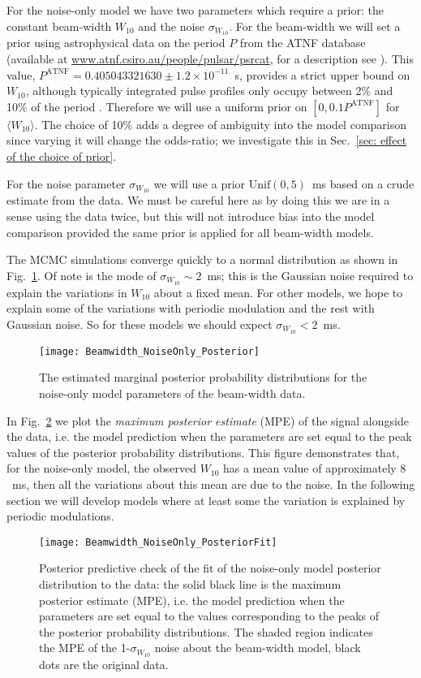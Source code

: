 \documentclass[../full_thesis/full_thesis.tex]{subfiles}
\newcommand{\PATNF}{P^{\mathrm{ATNF}}}
\newcommand{\Wave}{\langle W_{10} \rangle}
\begin{document}
For the noise-only model we have two parameters which require a prior: the
constant beam-width $W_{10}$ and the noise $\sigma_{W_{10}}$. For the
beam-width we will set a prior using astrophysical data on the period $P$
from the ATNF database
(available at \url{www.atnf.csiro.au/people/pulsar/psrcat}, for a description
see \cite{ATNF}). This value, $\PATNF=0.405043321630\pm 1.2\times10^{-11}$~s,
provides a strict upper bound on $W_{10}$, although typically integrated
pulse profiles only occupy between 2\% and 10\% of the period \citep{Lyne1988}.
Therefore we will use a uniform prior on $[0, 0.1 \PATNF]$ for $\Wave$.
The choice of 10\% adds a degree of ambiguity into the model comparison since
varying it will change the odds-ratio; we investigate this in
Sec.~\ref{sec: effect of the choice of prior}.

For the noise parameter
$\sigma_{W_{10}}$ we will use a prior $\textrm{Unif}(0, 5)$~ms
based on a crude estimate from the data. We must be careful here as by doing
this we are in a sense using the data twice, but this will not introduce bias
into the model comparison provided the same prior is applied for all beam-width
models.

The MCMC simulations converge quickly to a normal distribution as shown in
Fig.~\ref{fig: noise-only beam-width posterior}. Of note is the mode of
$\sigma_{W_{10}}\sim 2$~ms; this is the Gaussian noise required to explain the
variations in $W_{10}$ about a fixed mean. For other models, we hope to explain
some of the variations with periodic modulation and the rest with Gaussian
noise. So for these models we should expect $\sigma_{W_{10}} < 2$~ms.

\begin{figure}
\centering
\texttt{[image: Beamwidth\_NoiseOnly\_Posterior]}
\caption{The estimated marginal posterior probability distributions for the
noise-only model parameters of the beam-width data.}
\label{fig: noise-only beam-width posterior}
\end{figure}

In Fig.~\ref{fig: noise-only beam-width posterior fit} we plot the
\emph{maximum posterior estimate} (MPE) of the signal alongside the data, i.e.
the model prediction when the parameters are set equal to the peak values of
the posterior probability distributions.  This figure demonstrates that, for
the noise-only model, the observed $W_{10}$ has a mean value of approximately
$8$~ms, then all the variations about this mean are due to the noise. In the
following section we will develop models where at least some the variation is
explained by periodic modulations.
\begin{figure}
\centering
\texttt{[image: Beamwidth\_NoiseOnly\_PosteriorFit]}
\caption{Posterior predictive check of the fit of the noise-only model
posterior distribution to the data: the solid black line is the maximum
posterior estimate (MPE), i.e. the model prediction when the parameters are set
equal to the values corresponding to the peaks of the posterior probability
distributions.   The shaded region indicates the MPE of the 1-$\sigma_{W_{10}}$
noise about the beam-width model, black dots are the original data.}
\label{fig: noise-only beam-width posterior fit}
\end{figure}
\end{document}
